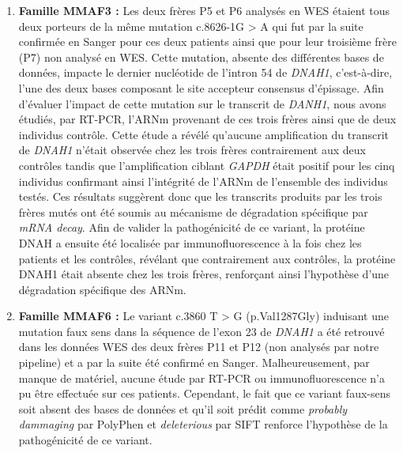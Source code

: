 \documentclass[12pt,a4paper,twoside]{ugathesis}
\theoremstyle{definition}
\theoremstyle{definition}
\theoremstyle{definition}
\theoremstyle{remark}
\begin{document}
\begin{enumerate}
\def\labelenumi{\arabic{enumi}.}
\item
  \textbf{Famille MMAF3 :} Les deux frères P5 et P6 analysés en WES
  étaient tous deux porteurs de la même mutation c.8626-1G
  \textgreater{} A qui fut par la suite confirmée en Sanger pour ces
  deux patients ainsi que pour leur troisième frère (P7) non analysé en
  WES. Cette mutation, absente des différentes bases de données, impacte
  le dernier nucléotide de l'intron 54 de \emph{DNAH1}, c'est-à-dire,
  l'une des deux bases composant le site accepteur consensus d'épissage.
  Afin d'évaluer l'impact de cette mutation sur le transcrit de
  \emph{DANH1}, nous avons étudiés, par RT-PCR, l'ARNm provenant de ces
  trois frères ainsi que de deux individus contrôle. Cette étude a
  révélé qu'aucune amplification du transcrit de \emph{DNAH1} n'était
  observée chez les trois frères contrairement aux deux contrôles tandis
  que l'amplification ciblant \emph{GAPDH} était positif pour les cinq
  individus confirmant ainsi l'intégrité de l'ARNm de l'ensemble des
  individus testés. Ces résultats suggèrent donc que les transcrits
  produits par les trois frères mutés ont été soumis au mécanisme de
  dégradation spécifique par \emph{mRNA decay}. Afin de valider la
  pathogénicité de ce variant, la protéine DNAH a ensuite été localisée
  par immunofluorescence à la fois chez les patients et les contrôles,
  révélant que contrairement aux contrôles, la protéine DNAH1 était
  absente chez les trois frères, renforçant ainsi l'hypothèse d'une
  dégradation spécifique des ARNm.
\item
  \textbf{Famille MMAF6 :} Le variant c.3860 T \textgreater{} G
  (p.Val1287Gly) induisant une mutation faux sens dans la séquence de
  l'exon 23 de \emph{DNAH1} a été retrouvé dans les données WES des deux
  frères P11 et P12 (non analysés par notre pipeline) et a par la suite
  été confirmé en Sanger. Malheureusement, par manque de matériel,
  aucune étude par RT-PCR ou immunofluorescence n'a pu être effectuée
  sur ces patients. Cependant, le fait que ce variant faux-sens soit
  absent des bases de données et qu'il soit prédit comme \emph{probably
  dammaging} par PolyPhen et \emph{deleterious} par SIFT renforce
  l'hypothèse de la pathogénicité de ce variant.
\end{enumerate}
\end{document}
